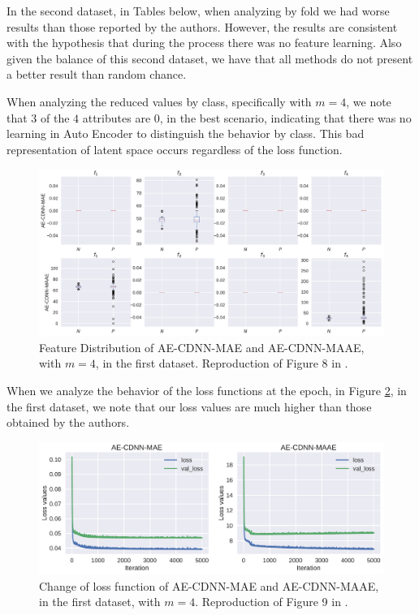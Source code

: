 In the second dataset, in Tables below, when analyzing by fold we had worse results than those reported by the authors. However, the results are consistent with the hypothesis that during the process there was no feature learning. Also given the balance of this second dataset, we have that all methods do not present a better result than random chance. 





When analyzing the reduced values by class, specifically with $m = 4$, we note that $3$ of the $4$ attributes are $0$, in the best scenario, indicating that there was no learning in Auto Encoder to distinguish the behavior by class. This bad representation of latent space occurs regardless of the loss function.


\begin{figure}[!ht]
\centering
\includegraphics[width=0.8\linewidth]{figure/feature_distribution_4.pdf}
  \caption{Feature Distribution of AE-CDNN-MAE and AE-CDNN-MAAE, with $m=4$, in the first dataset. Reproduction of Figure 8 in \cite{WenZha:2018}.  }
\label{fig:feature_distribution_4}
\end{figure}


When we analyze the behavior of the loss functions at the epoch, in Figure \ref{fig:change_loss_mae_maae}, in the first dataset, we note that our loss values are much higher than those obtained by the authors. 


\begin{figure}[!ht]
\centering
\includegraphics[width=0.8\linewidth]{figure/change_loss_mae_maae.pdf}
  \caption{Change of loss function of AE-CDNN-MAE and AE-CDNN-MAAE, in the first dataset, with $m=4$. Reproduction of Figure 9 in \cite{WenZha:2018}. }
\label{fig:change_loss_mae_maae}
\end{figure}



